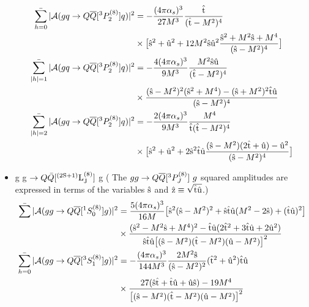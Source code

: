 \documentclass[aps,prc,preprint,superscriptaddress,showpacs,showkeys,amsmath]{revtex4-1}
\begin{document}
\begin{itemize}
\begin{equation}
\begin{split}
\mathop{{\bar{\sum_{h=0}}}} | {\cal A}(gq \to Q{\overline Q}[ ^3P_2^{(8)}] q) |^2 &=-{(4\pi {\alpha_{s}})^3 \over 27 M^3} {\hat{\rm t} \over (\hat{\rm t}-M^2)^4}\\
                                 & \times \bigl[ \hat{\rm s}^2+\hat{\rm u}^2+12 M^2 \hat{\rm s} \hat{\rm u}^2{\hat{\rm s}^2+M^2 \hat{\rm s} + M^4 \over(\hat{\rm s}-M^2)^4} \bigr]\\
\mathop{{\bar{\sum_{|h|=1}}}} | {\cal A}(gq \to Q{\overline Q}[ ^3P_2^{(8)}] q) |^2 &=-{4 (4\pi {\alpha_{s}})^3 \over 9 M^3} {M^2 \hat{\rm s}\hat{\rm u}\over (\hat{\rm t}-M^2)^4} \\
                                                                & \times {(\hat{\rm s}-M^2)^2 (\hat{\rm s}^2+M^4) - (\hat{\rm s}+M^2)^2 \hat{\rm t}\hat{\rm u}\over (\hat{\rm s}-M^2)^4}\\
\mathop{{\bar{\sum_{|h|=2}}}} | {\cal A}(gq \to Q{\overline Q}[ ^3P_2^{(8)}] q) |^2 &=-{2 (4\pi {\alpha_{s}})^3 \over 9 M^3} {M^4\over \hat{\rm t}(\hat{\rm t}-M^2)^4} \\
                                        & \times \bigl[ \hat{\rm s}^2+\hat{\rm u}^2 + 2 \hat{\rm s}^2 \hat{\rm t} \hat{\rm u}{(\hat{\rm s}-M^2)(2 \hat{\rm t}+\hat{\rm u}) - \hat{\rm u}^2 \over (\hat{\rm s}-M^2)^4} \bigr] 
\end{split}  
\end{equation}

\item g g $\rightarrow Q{\bar{Q}}[{\rm ^{(2S+1)}L_{J}^{(8)}}]$ g ( The $gg \to {Q{\overline Q}[ ^3P_J^{(8)}]}\ g$ squared amplitudes are expressed in 
  terms of the variables $\hat{\rm s}$ and $\hat{\rm z} \equiv \sqrt{\hat{\rm t}\hat{\rm u}}$.)
\begin{equation}
\begin{split}
\mathop{{\bar{\sum}}} | {\cal A}(gg \to {Q{\overline Q}[ ^1S_0^{(8)}]} g) |^2 &=
       {5 (4\pi {\alpha_{s}})^3 \over 16 M} \bigl[ \hat{\rm s}^2 (\hat{\rm s}-M^2)^2 + \hat{\rm s} \hat{\rm t}\hat{\rm u}(M^2-2\hat{\rm s}) + (\hat{\rm t}\hat{\rm u})^2 \bigr] \\
       &\times { (\hat{\rm s}^2-M^2 \hat{\rm s}+ M^4)^2-\hat{\rm t}\hat{\rm u}(2 \hat{\rm t}^2 + 3 \hat{\rm t}\hat{\rm u}+ 2 \hat{\rm u}^2) \over \hat{\rm s}\hat{\rm t}\hat{\rm u}\bigl[ (\hat{\rm s}-M^2) (\hat{\rm t}-M^2) (\hat{\rm u}-M^2) \bigr]^2}\\ 
\mathop{{\bar{\sum_{h=0}}}} | {\cal A}(g g \to Q{\overline Q}[ ^3S_1^{(8)}] g) |^2 &= -{(4\pi {\alpha_{s}})^3 \over 144 M^3}{2 M^2 \hat{\rm s} \over (\hat{\rm s}-M^2)^2} (\hat{\rm t}^2+\hat{\rm u}^2) \hat{\rm t}\hat{\rm u} \\
                                                              & \times {27(\hat{\rm s}\hat{\rm t}+\hat{\rm t}\hat{\rm u}+\hat{\rm u}\hat{\rm s})-19M^4 \over \bigl[(\hat{\rm s}-M^2)(\hat{\rm t}-M^2)(\hat{\rm u}-M^2)\bigr]^2}
\end{split}  
\end{equation}


\end{itemize}
\end{document}
